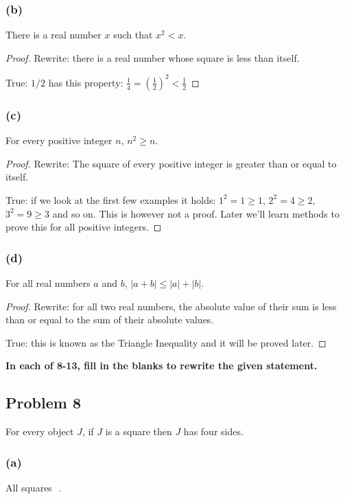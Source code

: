 \documentclass[14pt]{extarticle}
\newcommand{\dps}{\displaystyle}
\newcommand{\fbl}{\underline{\hspace{1cm}}\,\,}
\begin{document}
\subsubsection{(b)}
There is a real number $x$ such that $x^2 < x$.

\begin{proof}
    Rewrite: there is a real number whose square is less than itself.

    True: $1/2$ has this property: $\dps \frac{1}{4} = \left(\frac{1}{2}\right)^2 <
        \frac{1}{2}$
\end{proof}

\subsubsection{(c)}
For every positive integer $n$, $n^2 \geq n$.

\begin{proof}
    Rewrite: The square of every positive integer is greater than or equal to
    itself.

    True: if we look at the first few examples it holds: $1^2 = 1 \geq 1$, $2^2 = 4
        \geq 2$, $3^2 = 9 \geq 3$ and so on. This is however not a proof. Later we'll
    learn methods to prove this for all positive integers.
\end{proof}

\subsubsection{(d)}
For all real numbers $a$ and $b$, $|a + b| \leq |a| + |b|$.

\begin{proof}
    Rewrite: for all two real numbers, the absolute value of their sum is less than
    or equal to the sum of their absolute values.

    True: this is known as the Triangle Inequality and it will be proved later.
\end{proof}

{\bf In each of 8-13, fill in the blanks to rewrite the given statement.}

\subsection{Problem 8}
For every object $J$, if $J$ is a square then $J$ has four sides.

\subsubsection{(a)}
All squares \fbl.
\end{document}
